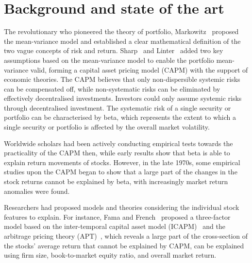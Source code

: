 \chapter[Background]{Background and state of the art}
\label{cpt:back}
The revolutionary who pioneered the theory of portfolio, Markowitz~\cite{portfolio} proposed the mean-variance model and established a clear mathematical definition of the two vague concepts of risk and return. Sharp~\cite{equilibrium} and Linter~\cite{diversification} added two key assumptions based on the mean-variance model to enable the portfolio mean-variance valid, forming a capital asset pricing model (CAPM) with the support of economic theories. The CAPM believes that only non-dispersible systemic risks can be compensated off, while non-systematic risks can be eliminated by effectively decentralised investments. Investors could only assume systemic risks through decentralised investment. The systematic risk of a single security or portfolio can be characterised by beta, which represents the extent to which a single security or portfolio is affected by the overall market volatility.

Worldwide scholars had been actively conducting empirical tests towards the practicality of the CAPM then, while early results show that beta is able to explain return movements of stocks. However, in the late 1970s, some empirical studies upon the CAPM began to show that a large part of the changes in the stock returns cannot be explained by beta, with increasingly market return anomalies were found.

Researchers had proposed models and theories considering the individual stock features to explain. For instance, Fama and French~\cite{riskfactors, anomalies} proposed a three-factor model based on the inter-temporal capital asset model (ICAPM)~\cite{intertemporal} and the arbitrage pricing theory (APT)~\cite{options}, which reveals a large part of the cross-section of the stocks’ average return that cannot be explained by CAPM, can be explained using firm size, book-to-market equity ratio, and overall market return.

